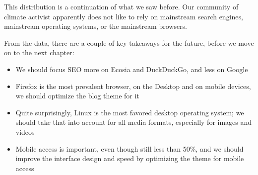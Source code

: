 This distribution is a continuation of what we saw before. Our community of climate activist apparently does not like to rely on mainstream search engines, mainstream operating systems, or the mainstream browsers.

From the data, there are a couple of key takeaways for the future, before we move on to the next chapter:

\begin{itemize}
 \item We should focus SEO more on Ecosia and DuckDuckGo, and less on Google
 \item Firefox is the most prevalent browser, on the Desktop and on mobile devices, we should optimize the blog theme for it
 \item Quite surprisingly, Linux is the most favored desktop operating system; we should take that into account for all media formats, especially for images and videos
 \item Mobile access is important, even though still less than 50\%, and we should improve the interface design and speed by optimizing the theme for mobile access
\end{itemize}
